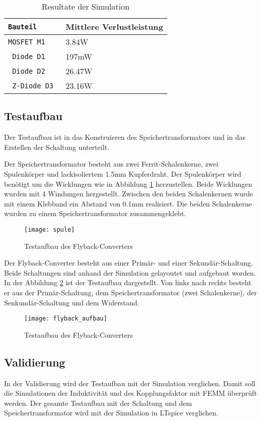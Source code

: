 \begin{table}[h]
	\centering
	\begin{tabular}{>{\tt}C{2.3cm}| C{6cm}} 
		\normalfont\textbf{Bauteil} & \normalfont\textbf{Mittlere Verlustleistung} \\ \hline\hline 
		MOSFET M1 & 3.84W  \\ \hline
		Diode D1 & 197mW  \\ \hline
		Diode D2 & 26.47W \\ \hline
		Z-Diode D3 & 23.16W  \\ \hline
	\end{tabular}
	\caption{Resultate der Simulation}
	\label{tab:LT_verlsutleistung}
\end{table}

\subsection{Testaufbau}
Der Testaufbau ist in das Konstruieren des Speichertransformators und in das Erstellen der Schaltung unterteilt. 

Der Speichertransformator besteht aus zwei Ferrit-Schalenkerne, zwei Spulenkörper und  lackisoliertem 1.5mm Kupferdraht. Der Spulenkörper wird benötigt um die Wicklungen wie in Abbildung \ref{fig:aufbau_spule} herzustellen. Beide Wicklungen wurden mit 4 Windungen hergestellt.
Zwischen den beiden Schalenkernen wurde mit einem Klebband ein Abstand von 0.1mm realisiert. Die beiden Schalenkerne wurden zu einem Speichertransformator zusammengeklebt.

\begin{figure}[H]
	\centering
	\texttt{[image: spule]}
	\caption{Testaufbau des Flyback-Converters}\label{fig:aufbau_spule}
\end{figure}

Der Flyback-Converter besteht aus einer Primär- und einer Sekundär-Schaltung. Beide Schaltungen sind anhand der Simulation gelayoutet und aufgebaut worden. In der Abbildung \ref{fig:testaufbau} ist der Testaufbau dargestellt. Von links nach rechts besteht er aus der Primär-Schaltung, dem Speichertransformator (zwei Schalenkerne), der Senkundär-Schaltung und dem Widerstand.

\begin{figure}[H]
	\centering
	\texttt{[image: flyback\_aufbau]}
	\caption{Testaufbau des Flyback-Converters}\label{fig:testaufbau}
\end{figure}

\subsection{Validierung}
In der Validierung wird der Testaufbau mit der Simulation verglichen. Damit soll die Simulationen der Induktivität und des Kopplungsfaktor mit FEMM  überprüft werden. Der gesamte Testaufbau mit der Schaltung und dem Speichertransformator wird mit der Simulation in LTspice verglichen.

